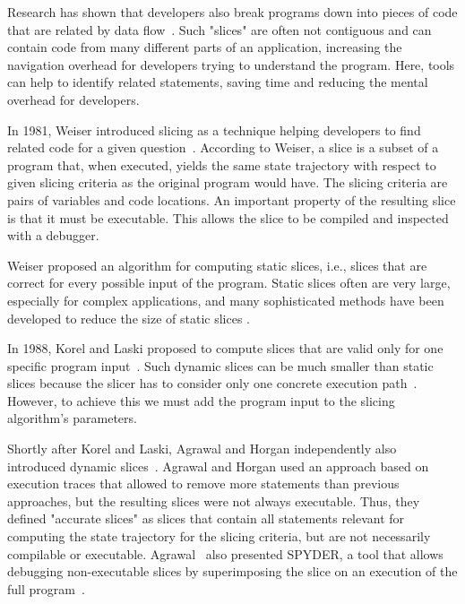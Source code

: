 Research has shown that developers also break programs down into pieces of code that are related by data flow~\cite{weiser82:programmers_use_slices_when}.
Such "slices" are often not contiguous and can contain code from many different parts of an application, increasing the navigation overhead for developers trying to understand the program.
Here, tools can help to identify related statements, saving time and reducing the mental overhead for developers.

In 1981, Weiser introduced slicing as a technique helping developers to find related code for a given question~\cite{weiser81:program_slicing}.
According to Weiser, a slice is a subset of a program that, when executed, yields the same state trajectory with respect to given slicing criteria as the original program would have.
The slicing criteria are pairs of variables and code locations.
An important property of the resulting slice is that it must be executable.
This allows the slice to be compiled and inspected with a debugger.

Weiser proposed an algorithm for computing static slices, i.e., slices that are correct for every possible input of the program.
Static slices often are very large, especially for complex applications, and many sophisticated methods have been developed to reduce the size of static slices .

In 1988, Korel and Laski proposed to compute slices that are valid only for one specific program input~\cite{korel88:dynamic_program_slicing}.
Such dynamic slices can be much smaller than static slices because the slicer has to consider only one concrete execution path~\cite{venkatesh95:experimental_results_from_dynamic, hoffner95:evaluation_and_comparison}.
However, to achieve this we must add the program input to the slicing algorithm's parameters.

Shortly after Korel and Laski, Agrawal and Horgan independently also introduced dynamic slices~\cite{agrawal90:dynamic_program_slicing}.
Agrawal and Horgan used an approach based on execution traces that allowed to remove more statements than previous approaches, but the resulting slices were not always executable.
Thus, they defined "accurate slices" as slices that contain all statements relevant for computing the state trajectory for the slicing criteria, but are not necessarily compilable or executable.
Agrawal \etal\ also presented SPYDER, a tool that allows debugging non-executable slices by superimposing the slice on an execution of the full program~\cite{agrawal93:debugging_with_dynamic_slicing}.

